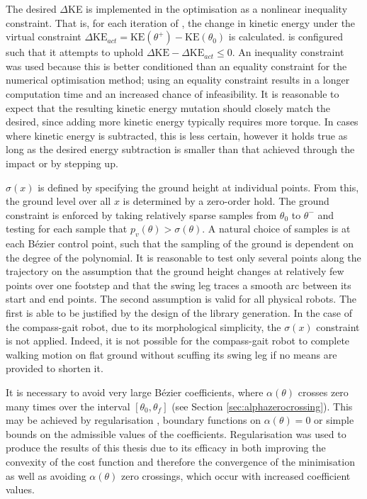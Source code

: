 The desired $\Delta$KE is implemented in the optimisation as a nonlinear inequality constraint. That is, for each iteration of , the change in kinetic energy under the virtual constraint $\Delta\mathrm{KE}_{act}=\mathrm{KE}(\theta^+)-\mathrm{KE}(\theta_0)$ is calculated.  is configured such that it attempts to uphold $\Delta\mathrm{KE}-\Delta\mathrm{KE}_{act}\leq 0$. An inequality constraint was used because this is better conditioned than an equality constraint for the numerical optimisation method; using an equality constraint results in a longer computation time and an increased chance of infeasibility. It is reasonable to expect that the resulting kinetic energy mutation should closely match the desired, since adding more kinetic energy typically requires more torque. In cases where kinetic energy is subtracted, this is less certain, however it holds true as long as the desired energy subtraction is smaller than that achieved through the impact or by stepping up.

$\sigma(x)$ is defined by specifying the ground height at individual points. From this, the ground level over all $x$ is determined by a zero-order hold. The ground constraint is enforced by taking relatively sparse samples from $\theta_0$ to $\theta^-$ and testing for each sample that $p_v(\theta)>\sigma(\theta)$. A natural choice of samples is at each Bézier control point, such that the sampling of the ground is dependent on the degree of the polynomial. It is reasonable to test only several points along the trajectory on the assumption that the ground height changes at relatively few points over one footstep and that the swing leg traces a smooth arc between its start and end points. The second assumption is valid for all physical robots. The first is able to be justified by the design of the library generation. In the case of the compass-gait robot, due to its morphological simplicity, the $\sigma(x)$ constraint is not applied. Indeed, it is not possible for the compass-gait robot to complete walking motion on flat ground without scuffing its swing leg if no means are provided to shorten it.

It is necessary to avoid very large Bézier coefficients, where $\alpha(\theta)$ crosses zero many times over the interval $[\theta_0, \theta_f]$ (see Section \ref{sec:alphazerocrossing}). This may be achieved by regularisation \cite{seidman1989well}, boundary functions on $\alpha(\theta) = 0$ or simple bounds on the admissible values of the coefficients. Regularisation was used to produce the results of this thesis due to its efficacy in both improving the convexity of the cost function and therefore the convergence of the minimisation as well as avoiding $\alpha(\theta)$ zero crossings, which occur with increased coefficient values. 

